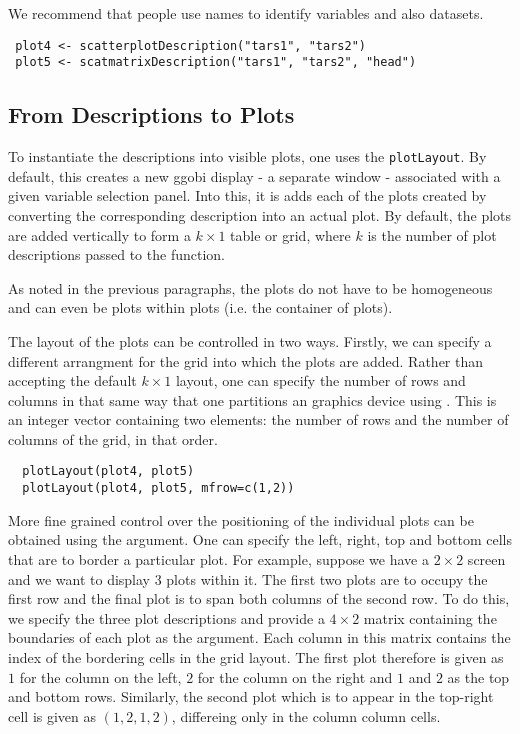 \documentclass{article}
\def\SFunction#1{{\texttt{\red #1}}}
\begin{document}
We recommend that people use names to identify variables
and also datasets.

\begin{verbatim}
 plot4 <- scatterplotDescription("tars1", "tars2")
 plot5 <- scatmatrixDescription("tars1", "tars2", "head")
\end{verbatim}


\subsection{From Descriptions to Plots}
To instantiate the descriptions into visible plots, one uses the
\SFunction{plotLayout}.  By default, this creates a new ggobi display
- a separate window - associated with a given variable selection
panel. Into this, it is adds each of the plots created by converting
the corresponding description into an actual plot.  By default, the
plots are added vertically to form a $k \times 1$ table or grid, where
$k$ is the number of plot descriptions passed to the function.

As noted in the previous paragraphs, the plots do not have to be
homogeneous and can even be plots within plots (i.e. the container of
plots).


The layout of the plots can be controlled in two ways.  Firstly, we
can specify a different arrangment for the grid into which the plots
are added.  Rather than accepting the default $k \times 1$ layout, one
can specify the number of rows and columns in that same way that one
partitions an \R{} graphics device using .  This is an
integer vector containing two elements: the number of rows and the
number of columns of the grid, in that order.

\begin{verbatim}
  plotLayout(plot4, plot5)
  plotLayout(plot4, plot5, mfrow=c(1,2))
\end{verbatim}


More fine grained control over the positioning of the individual plots
can be obtained using the  argument. One can specify the
left, right, top and bottom cells that are to border a particular
plot.  For example, suppose we have a $2 \times 2$ screen and we want
to display 3 plots within it.  The first two plots are to occupy the
first row and the final plot is to span both columns of the second
row. To do this, we specify the three plot descriptions and provide a
$4 \times 2$ matrix containing the boundaries of each plot as the
 argument.  Each column in this matrix contains the index
of the bordering cells in the grid layout. The first plot therefore is
given as $1$ for the column on the left, $2$ for the column on the
right and $1$ and $2$ as the top and bottom rows.  Similarly, the
second plot which is to appear in the top-right cell is given as $(1,
2, 1, 2)$, differeing only in the column column cells.
\end{document}
